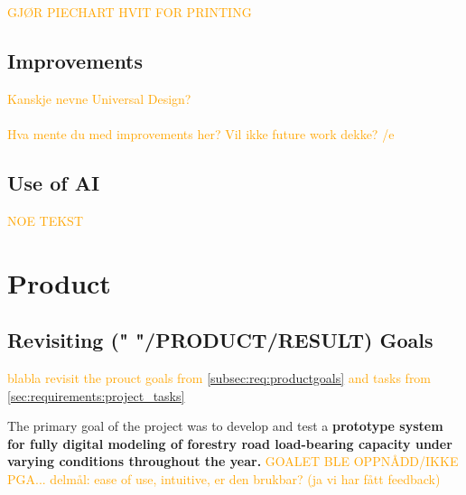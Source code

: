\textcolor{orange}{GJØR PIECHART HVIT FOR PRINTING}


\subsection{Improvements}

\textcolor{orange}{Kanskje nevne Universal Design? \\ \\
Hva mente du med improvements her? Vil ikke future work dekke? /e}

\subsection{Use of AI}

\textcolor{orange}{NOE TEKST}

\section{Product}

\subsection{Revisiting (" "/PRODUCT/RESULT) Goals}

\textcolor{orange}{blabla revisit the prouct goals from \autoref{subsec:req:productgoals} and tasks from \autoref{sec:requirements:project_tasks}}

The primary goal of the project was to develop and test a \textbf{prototype system for fully digital modeling of forestry road load-bearing capacity under varying conditions throughout the year.} \textcolor{orange}{GOALET BLE OPPNÅDD/IKKE PGA... delmål: ease of use, intuitive, er den brukbar? (ja vi har fått feedback)}

